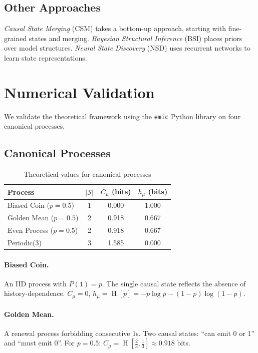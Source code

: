 \documentclass[11pt,twocolumn]{article}
\theoremstyle{plain}
\theoremstyle{definition}
\theoremstyle{remark}
\newcommand{\Cmu}{C_\mu}
\newcommand{\hmu}{h_\mu}
\newcommand{\calS}{\mathcal{S}}
\DeclareMathOperator{\Ent}{H}
\begin{document}
\subsection{Other Approaches}

\emph{Causal State Merging} (CSM) takes a bottom-up approach, starting with fine-grained states and merging. \emph{Bayesian Structural Inference} (BSI) \cite{strelioff2014bayesian} places priors over model structures. \emph{Neural State Discovery} (NSD) uses recurrent networks to learn state representations.

\section{Numerical Validation}
\label{sec:validation}

We validate the theoretical framework using the \texttt{emic} Python library on four canonical processes.

\subsection{Canonical Processes}

\begin{table}[h]
\centering
\caption{Theoretical values for canonical processes}
\label{tab:canonical}
\small
\begin{tabular}{lccc}
\toprule
Process & $|\calS|$ & $\Cmu$ (bits) & $\hmu$ (bits) \\
\midrule
Biased Coin ($p=0.5$) & 1 & 0.000 & 1.000 \\
Golden Mean ($p=0.5$) & 2 & 0.918 & 0.667 \\
Even Process ($p=0.5$) & 2 & 0.918 & 0.667 \\
Periodic(3) & 3 & 1.585 & 0.000 \\
\bottomrule
\end{tabular}
\end{table}

\paragraph{Biased Coin.} An IID process with $P(1) = p$. The single causal state reflects the absence of history-dependence. $\Cmu = 0$, $\hmu = \Ent[p] = -p \log p - (1-p)\log(1-p)$.

\paragraph{Golden Mean.} A renewal process forbidding consecutive $1$s. Two causal states: ``can emit 0 or 1'' and ``must emit 0''. For $p = 0.5$: $\Cmu = \Ent[\frac{2}{3}, \frac{1}{3}] \approx 0.918$ bits.
\end{document}
